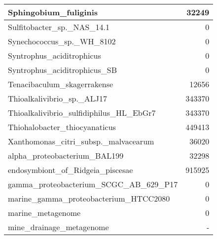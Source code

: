 \documentclass[12pt,a4paper]{article}
\begin{document}
\begin{table}[ht]
\begin{center}
\begin{tabular}{|l*{1}{|r}|}
Sphingobium\_fuliginis & 32249 \\ \hline
Sulfitobacter\_sp.\_NAS\_14.1 & 0 \\ \hline
Synechococcus\_sp.\_WH\_8102 & 0 \\ \hline
Syntrophus\_aciditrophicus & 0 \\ \hline
Syntrophus\_aciditrophicus\_SB & 0 \\ \hline
Tenacibaculum\_skagerrakense & 12656 \\ \hline
Thioalkalivibrio\_sp.\_ALJ17 & 343370 \\ \hline
Thioalkalivibrio\_sulfidiphilus\_HL\_EbGr7 & 343370 \\ \hline
Thiohalobacter\_thiocyanaticus & 449413 \\ \hline
Xanthomonas\_citri\_subsp.\_malvacearum & 36020 \\ \hline
alpha\_proteobacterium\_BAL199 & 32298 \\ \hline
endosymbiont\_of\_Ridgeia\_piscesae & 915925 \\ \hline
gamma\_proteobacterium\_SCGC\_AB\_629\_P17 & 0 \\ \hline
marine\_gamma\_proteobacterium\_HTCC2080 & 0 \\ \hline
marine\_metagenome & 0 \\ \hline
mine\_drainage\_metagenome & - \\ \hline
\end{tabular}
\end{center}
\end{table}
\end{document}
